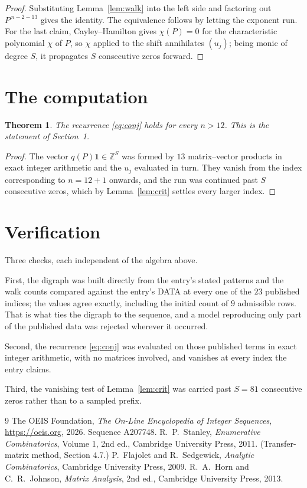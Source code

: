 \documentclass[11pt,a4paper]{article}
\theoremstyle{plain}
\newtheorem{theorem}{Theorem}
\theoremstyle{definition}
\begin{document}
\begin{proof}
Substituting Lemma~\ref{lem:walk} into the left side and factoring out
$P^{\,n-2-13}$ gives the identity. The equivalence follows by letting the exponent
run. For the last claim, Cayley--Hamilton gives $\chi(P)=0$ for the characteristic
polynomial $\chi$ of $P$, so $\chi$ applied to the shift annihilates $(u_j)$; being monic of
degree $S$, it propagates $S$ consecutive zeros forward.
\end{proof}

\section{The computation}

\begin{theorem}
The recurrence \eqref{eq:conj} holds for every $n>12$. This is the statement of
Section~1.
\end{theorem}

\begin{proof}
The vector $q(P)\mathbf{1}\in\mathbb{Z}^{S}$ was formed by $13$ matrix--vector
products in exact integer arithmetic and the $u_j$ evaluated in turn. They vanish from the
index corresponding to $n=12+1$ onwards, and the run was continued past $S$ consecutive
zeros, which by Lemma~\ref{lem:crit} settles every larger index.
\end{proof}

\section{Verification}

Three checks, each independent of the algebra above.

First, the digraph was built directly from the entry's stated patterns and the walk counts
compared against the entry's DATA at every one of the $23$ published indices; the
values agree exactly, including the initial count of $9$ admissible rows. That is
what ties the digraph to the sequence, and a model reproducing only part of the published
data was rejected wherever it occurred.

Second, the recurrence \eqref{eq:conj} was evaluated on those published terms in exact
integer arithmetic, with no matrices involved, and vanishes at every index the entry claims.

Third, the vanishing test of Lemma~\ref{lem:crit} was carried past $S=81$ consecutive
zeros rather than to a sampled prefix.

\begin{thebibliography}{9}
 The OEIS Foundation, \emph{The On-Line Encyclopedia of Integer
Sequences}, \url{https://oeis.org}, 2026. Sequence A207748.
 R.~P.~Stanley, \emph{Enumerative Combinatorics}, Volume 1, 2nd ed.,
Cambridge University Press, 2011. (Transfer-matrix method, Section 4.7.)
 P.~Flajolet and R.~Sedgewick, \emph{Analytic Combinatorics}, Cambridge
University Press, 2009.
 R.~A.~Horn and C.~R.~Johnson, \emph{Matrix Analysis}, 2nd ed., Cambridge
University Press, 2013.
\end{thebibliography}
\end{document}
